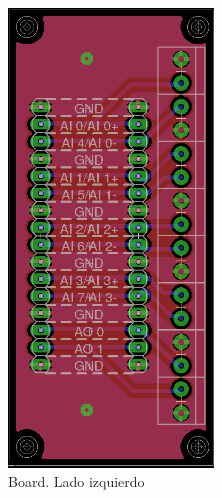 \begin{figure}[h!]
  \centering
  \begin{subfigure}{0.4\textwidth}
    \centering
    \includegraphics[width=0.6\textwidth]{images/activities/daq/board-daq-left.png}
    \caption{Board. Lado izquierdo}
    \label{fig:board-daq-left}
  \end{subfigure}
  \hfill
  \begin{subfigure}{0.4\textwidth}
    \centering

\end{subfigure}
\end{figure}

